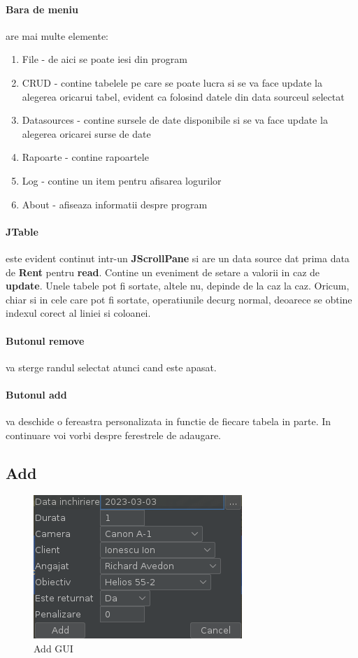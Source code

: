 \documentclass[oneside]{article}
\begin{document}
\paragraph{Bara de meniu} are mai multe elemente:
\begin{enumerate}
    \item File - de aici se poate iesi din program
    \item CRUD - contine tabelele pe care se poate lucra si se va face update la alegerea oricarui tabel, evident ca folosind datele din data sourceul selectat
    \item Datasources - contine sursele de date disponibile si se va face update la alegerea oricarei surse de date
    \item Rapoarte - contine rapoartele
    \item Log - contine un item pentru afisarea logurilor
    \item About - afiseaza informatii despre program
\end{enumerate}

\paragraph{JTable} este evident continut intr-un \textbf{JScrollPane} si are un data source dat prima data de \textbf{Rent} pentru \textbf{read}. Contine un eveniment de setare a valorii in caz de \textbf{update}. Unele tabele pot fi sortate, altele nu, depinde de la caz la caz. Oricum, chiar si in cele care pot fi  sortate, operatiunile decurg normal, deoarece se obtine indexul corect al liniei si coloanei.

\paragraph{Butonul remove} va sterge randul selectat atunci cand este apasat.

\paragraph{Butonul add} va deschide o fereastra personalizata in functie de fiecare tabela in parte. In continuare voi vorbi despre ferestrele de adaugare.

\subsection[Add]{Add}
\begin{figure}[ht]
    \centering
    \noindent\includegraphics[scale=0.7]{addgui.png}
    \caption{Add GUI}
    \label{fig:addgui}
\end{figure}
\end{document}
